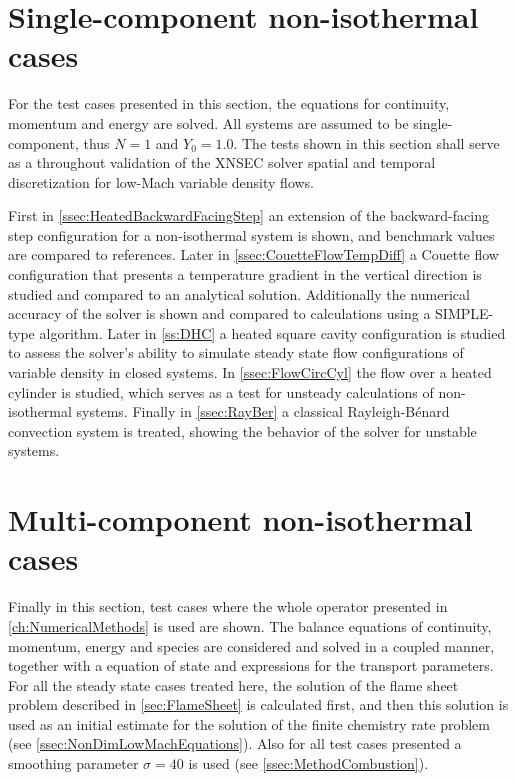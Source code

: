 \section{Single-component non-isothermal cases} \label{sec:SinCompNonIsothermCase}
For the test cases presented in this section, the equations for continuity, momentum and energy are solved. All systems are assumed to be single-component, thus $N = 1$ and $Y_0 = 1.0$. 
The tests shown in this section shall serve as a throughout validation of the XNSEC solver spatial and temporal discretization for low-Mach variable density flows. 

First in \cref{ssec:HeatedBackwardFacingStep} an extension of the backward-facing step configuration for a non-isothermal system is shown, and benchmark values are compared to references. Later in \cref{ssec:CouetteFlowTempDiff} a Couette flow configuration that presents a temperature gradient in the vertical direction is studied and compared to an analytical solution. Additionally the numerical accuracy of the solver is shown and compared to calculations using a SIMPLE-type algorithm. Later in \cref{ss:DHC} a heated square cavity configuration is studied to assess the solver's ability to simulate steady state flow configurations of variable density in closed systems. In \cref{ssec:FlowCircCyl} the flow over a heated cylinder is studied, which serves as a test for unsteady calculations of non-isothermal systems. Finally in \cref{ssec:RayBer} a classical Rayleigh-Bénard convection system is treated, showing the behavior of the solver for unstable systems.





\section{Multi-component non-isothermal cases}\label{sec:MultCompNonIsothermCase}
Finally in this section, test cases where the whole operator presented in \cref{ch:NumericalMethods} is used are shown. The balance equations of continuity, momentum, energy and species are considered and solved in a coupled manner, together with a equation of state and expressions for the transport parameters. For all the steady state cases treated here, the solution of the flame sheet problem described in \cref{sec:FlameSheet} is calculated first, and then this solution is used as an initial estimate for the solution of the finite chemistry rate problem (see \cref{ssec:NonDimLowMachEquations}). Also for all test cases presented a smoothing parameter $\sigma = 40$ is used (see \cref{ssec:MethodCombustion}). 

